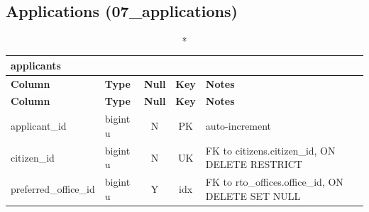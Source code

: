 \subsection*{Applications (07\_applications)}
\begin{longtable}{@{}p{3.4cm}p{2.9cm}c c p{5.6cm}@{}}
\caption*{\textbf{applicants}}\\
\toprule \textbf{Column} & \textbf{Type} & \textbf{Null} & \textbf{Key} & \textbf{Notes} \\ \midrule \endfirsthead
\toprule \textbf{Column} & \textbf{Type} & \textbf{Null} & \textbf{Key} & \textbf{Notes} \\ \midrule \endhead
\bottomrule \endlastfoot
applicant\_\allowbreak{}id & bigint u & N & PK & auto-increment \\
citizen\_\allowbreak{}id & bigint u & N & UK & FK to citizens.citizen\_\allowbreak{}id, ON DELETE RESTRICT \\
preferred\_\allowbreak{}office\_\allowbreak{}id & bigint u & Y & idx & FK to rto\_\allowbreak{}offices.office\_\allowbreak{}id, ON DELETE SET NULL \\
\end{longtable}
\vspace{-0.4em}
